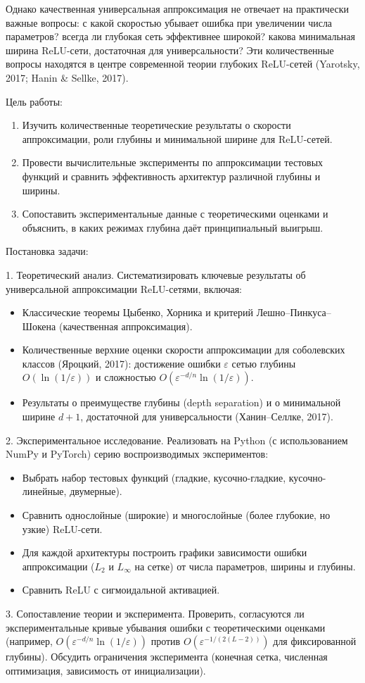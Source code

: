 \documentclass[12pt]{article}
\begin{document}
	Однако качественная универсальная аппроксимация не отвечает на практически важные вопросы: с какой скоростью убывает ошибка при увеличении числа параметров? всегда ли глубокая сеть эффективнее широкой? какова минимальная ширина ReLU-сети, достаточная для универсальности? Эти количественные вопросы находятся в центре современной теории глубоких ReLU-сетей (Yarotsky, 2017; Hanin \& Sellke, 2017).
	\vspace{5mm}

	Цель работы:
	\begin{enumerate}
		\item Изучить количественные теоретические результаты о скорости аппроксимации, роли глубины и минимальной ширине для ReLU-сетей.
		\item Провести вычислительные эксперименты по аппроксимации тестовых функций и сравнить эффективность архитектур различной глубины и ширины.
		\item Сопоставить экспериментальные данные с теоретическими оценками и объяснить, в каких режимах глубина даёт принципиальный выигрыш.
	\end{enumerate}
	Постановка \vspace{5mm} задачи:
	
	1. Теоретический анализ. Систематизировать ключевые результаты об универсальной аппроксимации ReLU-сетями, включая:
	\begin{itemize}
		\item Классические теоремы Цыбенко, Хорника и критерий Лешно–Пинкуса–Шокена (качественная аппроксимация).
		\item Количественные верхние оценки скорости аппроксимации для соболевских классов (Яроцкий, 2017): достижение ошибки $\varepsilon$ сетью глубины $O(\ln(1/\varepsilon))$ и сложностью $O(\varepsilon^{-d/n}\ln(1/\varepsilon))$.
		\item Результаты о преимуществе глубины (depth separation) и о минимальной ширине $d+1$, достаточной для универсальности (Ханин–Селлке, 2017).
	\end{itemize}
	2. Экспериментальное исследование. Реализовать на Python (с использованием NumPy и PyTorch) серию воспроизводимых экспериментов:
	\begin{itemize}
		\item Выбрать набор тестовых функций (гладкие, кусочно-гладкие, кусочно-линейные, двумерные).
		\item Сравнить однослойные (широкие) и многослойные (более глубокие, но узкие) ReLU-сети.
		\item Для каждой архитектуры построить графики зависимости ошибки аппроксимации ($L_2$ и $L_\infty$ на сетке) от числа параметров, ширины и глубины.
		\item Сравнить ReLU с сигмоидальной активацией.
	\end{itemize}
	3. Сопоставление теории и эксперимента. Проверить, согласуются ли экспериментальные кривые убывания ошибки с теоретическими оценками (например, $O(\varepsilon^{-d/n}\ln(1/\varepsilon))$ против $O(\varepsilon^{-1/(2(L-2))})$ для фиксированной глубины). Обсудить ограничения эксперимента (конечная сетка, численная
	\vspace{5mm} оптимизация, зависимость от инициализации).
	
\end{document}
